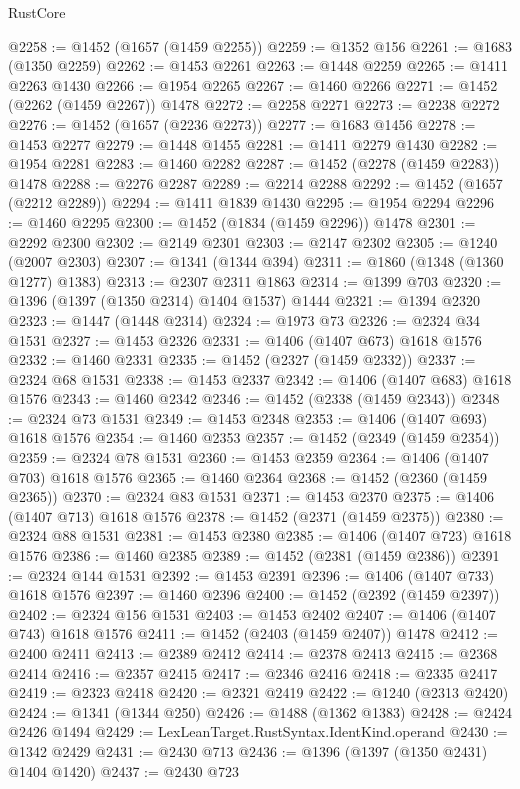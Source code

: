 \begin{lexlean}{RustCore}
\begin{coremodule}
@2258 := @1452 (@1657 (@1459 @2255))
@2259 := @1352 @156
@2261 := @1683 (@1350 @2259)
@2262 := @1453 @2261
@2263 := @1448 @2259
@2265 := @1411 @2263 @1430
@2266 := @1954 @2265
@2267 := @1460 @2266
@2271 := @1452 (@2262 (@1459 @2267)) @1478
@2272 := @2258 @2271
@2273 := @2238 @2272
@2276 := @1452 (@1657 (@2236 @2273))
@2277 := @1683 @1456
@2278 := @1453 @2277
@2279 := @1448 @1455
@2281 := @1411 @2279 @1430
@2282 := @1954 @2281
@2283 := @1460 @2282
@2287 := @1452 (@2278 (@1459 @2283)) @1478
@2288 := @2276 @2287
@2289 := @2214 @2288
@2292 := @1452 (@1657 (@2212 @2289))
@2294 := @1411 @1839 @1430
@2295 := @1954 @2294
@2296 := @1460 @2295
@2300 := @1452 (@1834 (@1459 @2296)) @1478
@2301 := @2292 @2300
@2302 := @2149 @2301
@2303 := @2147 @2302
@2305 := @1240 (@2007 @2303)
@2307 := @1341 (@1344 @394)
@2311 := @1860 (@1348 (@1360 @1277) @1383)
@2313 := @2307 @2311 @1863
@2314 := @1399 @703
@2320 := @1396 (@1397 (@1350 @2314) @1404 @1537) @1444
@2321 := @1394 @2320
@2323 := @1447 (@1448 @2314)
@2324 := @1973 @73
@2326 := @2324 @34 @1531
@2327 := @1453 @2326
@2331 := @1406 (@1407 @673) @1618 @1576
@2332 := @1460 @2331
@2335 := @1452 (@2327 (@1459 @2332))
@2337 := @2324 @68 @1531
@2338 := @1453 @2337
@2342 := @1406 (@1407 @683) @1618 @1576
@2343 := @1460 @2342
@2346 := @1452 (@2338 (@1459 @2343))
@2348 := @2324 @73 @1531
@2349 := @1453 @2348
@2353 := @1406 (@1407 @693) @1618 @1576
@2354 := @1460 @2353
@2357 := @1452 (@2349 (@1459 @2354))
@2359 := @2324 @78 @1531
@2360 := @1453 @2359
@2364 := @1406 (@1407 @703) @1618 @1576
@2365 := @1460 @2364
@2368 := @1452 (@2360 (@1459 @2365))
@2370 := @2324 @83 @1531
@2371 := @1453 @2370
@2375 := @1406 (@1407 @713) @1618 @1576
@2378 := @1452 (@2371 (@1459 @2375))
@2380 := @2324 @88 @1531
@2381 := @1453 @2380
@2385 := @1406 (@1407 @723) @1618 @1576
@2386 := @1460 @2385
@2389 := @1452 (@2381 (@1459 @2386))
@2391 := @2324 @144 @1531
@2392 := @1453 @2391
@2396 := @1406 (@1407 @733) @1618 @1576
@2397 := @1460 @2396
@2400 := @1452 (@2392 (@1459 @2397))
@2402 := @2324 @156 @1531
@2403 := @1453 @2402
@2407 := @1406 (@1407 @743) @1618 @1576
@2411 := @1452 (@2403 (@1459 @2407)) @1478
@2412 := @2400 @2411
@2413 := @2389 @2412
@2414 := @2378 @2413
@2415 := @2368 @2414
@2416 := @2357 @2415
@2417 := @2346 @2416
@2418 := @2335 @2417
@2419 := @2323 @2418
@2420 := @2321 @2419
@2422 := @1240 (@2313 @2420)
@2424 := @1341 (@1344 @250)
@2426 := @1488 (@1362 @1383)
@2428 := @2424 @2426 @1494
@2429 := LexLeanTarget.RustSyntax.IdentKind.operand
@2430 := @1342 @2429
@2431 := @2430 @713
@2436 := @1396 (@1397 (@1350 @2431) @1404 @1420)
@2437 := @2430 @723

\end{coremodule}
\end{lexlean}

